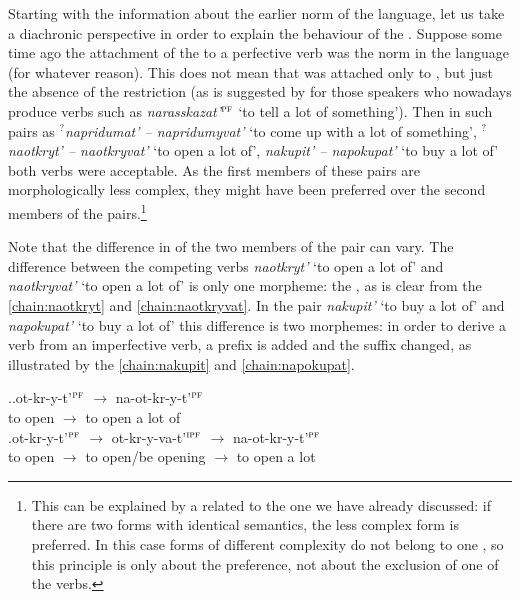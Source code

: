 Starting with the information about the earlier norm of the language, let us take a diachronic perspective in order to explain the behaviour of the  . Suppose some time ago the attachment of the   to a perfective verb was the norm in the language (for whatever reason). This does not mean that  was attached only to , but just the absence of the restriction (as is suggested by \citet{Tatevosov:13a} for those speakers who nowadays produce verbs such as \textit{narasskazat'}$^{\textsc{pf}}$ `to tell a lot of something'). Then in such pairs as \textit{$^?$napridumat' -- napridumyvat'} `to come up with a lot of something', \textit{$^?$naotkryt' -- naotkryvat'} `to open a lot of', \textit{nakupit' -- napokupat'} `to buy a lot of' both verbs were acceptable. As the first members of these pairs are morphologically less complex, they might have been preferred over the second members of the pairs.\footnote{This can be explained by a  related to the one we have already discussed: if there are two forms with identical semantics, the less complex form is preferred. In this case forms of different complexity do not belong to one , so this principle is only about the preference, not about the exclusion of one of the verbs.} 

Note that the difference in  of the two members of the pair can vary. The  difference between the competing verbs \textit{naotkryt'} `to open a lot of' and \textit{naotkryvat'} `to open a lot of' is only one morpheme: the , as is clear from the  \ref{chain:naotkryt} and \ref{chain:naotkryvat}. In the pair  \textit{nakupit'} `to buy a lot of' and  \textit{napokupat'} `to buy a lot of' this difference is two morphemes: in order to derive a  verb from an imperfective verb, a prefix is added and the suffix changed, as illustrated by the  \ref{chain:nakupit} and \ref{chain:napokupat}.

\ex.\ag.\label{chain:naotkryt}ot-kr-y-t'$^{\textsc{pf}}$ $\rightarrow$ na-ot-kr-y-t'$^{\textsc{pf}}$\\
{to open} $\rightarrow$ {to open a lot of}\\
\bg.\label{chain:naotkryvat}ot-kr-y-t'$^{\textsc{pf}}$ $\rightarrow$ ot-kr-y-va-t'$^{\textsc{ipf}}$ $\rightarrow$ na-ot-kr-y-t'$^{\textsc{pf}}$\\
{to open} $\rightarrow$ {to open/be opening} $\rightarrow$ {to open a lot}\\

